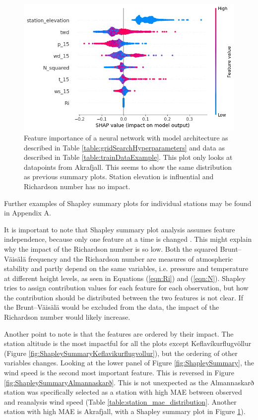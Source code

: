 \begin{figure}
    \centering
    \includegraphics[scale = 0.6]{Figures/shap_plots/summary_plot_31572.png}
    \caption[Summary feature importance of a neural network only looking at AWS at Akrafjall.]{Feature importance of a neural network with model architecture as described in Table \ref{table:gridSearchHyperparameters} and data as described in Table \ref{table:trainDataExample}. This plot only looks at datapoints from Akrafjall. This seems to show the same distribution as previous summary plots. Station elevation is influential and Richardson number has no impact.}
    \label{fig:ShapleySummaryAkrafjall}
\end{figure}

Further examples of Shapley summary plots for individual stations may be found in Appendix A.

It is important to note that Shapley summary plot analysis assumes feature independence, because only one feature at a time is changed \cite{Salih_2024}. This might explain why the impact of the Richardson number is so low. Both the squared Brunt–Väisälä frequency and the Richardson number are measures of atmospheric stability and partly depend on the same variables, i.e. pressure and temperature at different height levels, as seen in Equations (\ref{eqn:Ri}) and (\ref{eqn:N}). Shapley tries to assign contribution values for each feature for each observation, but how the contribution should be distributed between the two features is not clear. If the Brunt–Väisälä would be excluded from the data, the impact of the Richardson number would likely increase.

Another point to note is that the features are ordered by their impact. The station altitude is the most impactful for all the plots except Keflavíkurflugvöllur (Figure \ref{fig:ShapleySummaryKeflavikurflugvollur}), but the ordering of other variables changes. Looking at the lower panel of Figure \ref{fig:ShapleySummary}, the wind speed is the second most important feature. This is reversed in Figure \ref{fig:ShapleySummaryAlmannaskarð}. This is not unexpected as the Almannaskarð station was specifically selected as a station with high MAE between observed and reanalysis wind speed (Table \ref{table:station_mae_distribution}. Another station with high MAE is Akrafjall, with a Shapley summary plot in Figure \ref{fig:ShapleySummaryAkrafjall}).


